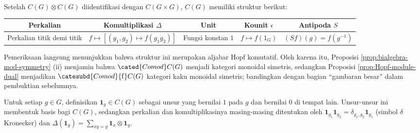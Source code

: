 Setelah $C(G) \otimes C(G)$ diidentifikasi dengan $C(G \times G)$, $C(G)$
memiliki struktur berikut:
\begin{center}\begin{tabular}{|c|c|c|c|c|} \hline
	Perkalian & Komultiplikasi $\Delta$ & Unit & Kounit $\epsilon$ & Antipoda $S$ \\ \hline
	Perkalian titik demi titik & $f \mapsto \left[ (g_1, g_2) \mapsto f(g_1 g_2) \right]$ & Fungsi konstan $1$ & $f \mapsto f(1_G)$ & $(Sf)(g) = f(g^{-1})$ \\ \hline
\end{tabular}\end{center}
Pemeriksaan langsung menunjukkan bahwa struktur ini merupakan aljabar Hopf
komutatif. Oleh karena itu, Proposisi \ref{prop:bialgebra-mod-symmetry} (ii)
menjamin bahwa $\cated{Comod}C(G)$ menjadi kategori monoidal simetris, sedangkan
Proposisi \ref{prop:Hopf-module-dual} menjadikan
$\catesubd{Comod}{\mathrm{f}}C(G)$ kategori kaku monoidal simetris; bandingkan
dengan bagian ``gambaran besar'' dalam pembuktian sebelumnya.

Untuk setiap $g \in G$, definisikan $\mathbf{1}_g \in C(G)$ sebagai unsur yang
bernilai $1$ pada $g$ dan bernilai $0$ di tempat lain. Unsur-unsur ini
membentuk basis bagi $C(G)$, sedangkan perkalian dan komultiplikasinya
masing-masing ditentukan oleh
$\mathbf{1}_{g_1} \mathbf{1}_{g_2} = \delta_{g_1, g_2} \mathbf{1}_{g_1}$
(simbol $\delta$ Kronecker) dan
$\Delta(\mathbf{1}_g) = \sum_{xy=g} \mathbf{1}_x \otimes \mathbf{1}_y$.

